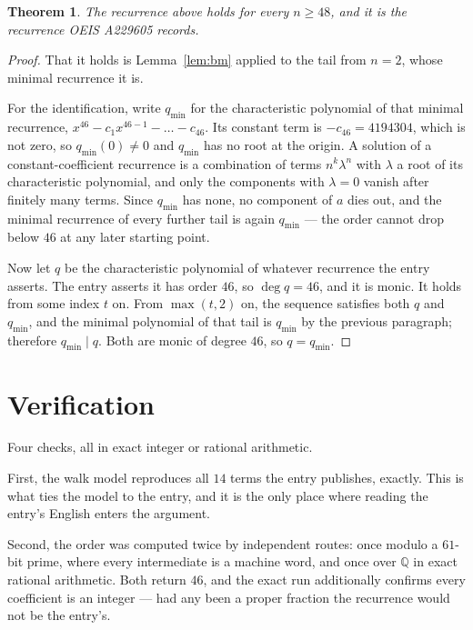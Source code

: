 \documentclass[11pt,a4paper]{article}
\theoremstyle{plain}
\newtheorem{theorem}{Theorem}
\theoremstyle{definition}
\begin{document}
\begin{theorem}
The recurrence above holds for every $n\ge48$, and it is the recurrence OEIS A229605 records.
\end{theorem}

\begin{proof}
That it holds is Lemma~\ref{lem:bm} applied to the tail from $n=2$, whose minimal
recurrence it is.

For the identification, write $q_{\min}$ for the characteristic polynomial of that minimal
recurrence, $x^{46}-c_1x^{46-1}-\dots-c_{46}$. Its constant term is
$-c_{46}=4194304$, which is not zero, so $q_{\min}(0)\neq0$ and $q_{\min}$ has no
root at the origin. A solution of a constant-coefficient recurrence is a combination of terms
$n^{k}\lambda^{n}$ with $\lambda$ a root of its characteristic polynomial, and only the
components with $\lambda=0$ vanish after finitely many terms. Since $q_{\min}$ has none, no
component of $a$ dies out, and the minimal recurrence of every further tail is again
$q_{\min}$ --- the order cannot drop below $46$ at any later starting point.

Now let $q$ be the characteristic polynomial of whatever recurrence the entry asserts. The
entry asserts it has order $46$, so $\deg q=46$, and it is monic. It holds from some
index $t$ on. From $\max(t,2)$ on, the sequence satisfies both $q$ and $q_{\min}$, and
the minimal polynomial of that tail is $q_{\min}$ by the previous paragraph; therefore
$q_{\min}\mid q$. Both are monic of degree $46$, so $q=q_{\min}$.
\end{proof}

\section{Verification}

Four checks, all in exact integer or rational arithmetic.

First, the walk model reproduces all $14$ terms the entry publishes, exactly. This is
what ties the model to the entry, and it is the only place where reading the entry's English
enters the argument.

Second, the order was computed twice by independent routes: once modulo a $61$-bit prime, where
every intermediate is a machine word, and once over $\mathbb{Q}$ in exact rational arithmetic.
Both return $46$, and the exact run additionally confirms every coefficient is an integer
--- had any been a proper fraction the recurrence would not be the entry's.
\end{document}
